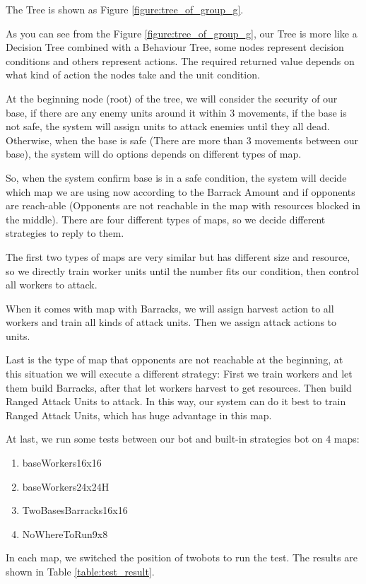 The Tree is shown as Figure \ref{figure:tree_of_group_g}.



As you can see from the Figure \ref{figure:tree_of_group_g}, our Tree is more like a Decision Tree combined with
a Behaviour Tree, some nodes represent decision conditions and others represent actions. The required
returned value depends on what kind of action the nodes take and the unit condition. 

At the beginning node (root) of the tree, we will consider the security of our base, if there are any enemy
units around it within 3 movements, if the base is not safe, the system will assign units to attack enemies
until they all dead. Otherwise, when the base is safe (There are more than 3 movements between our base),
the system will do options depends on different types of map. 

So, when the system confirm base is in a safe condition, the system will decide which map we are using now
according to the Barrack Amount and if opponents are reach-able (Opponents are not reachable in the map with
resources blocked in the middle). There are four different types of maps, so we decide different strategies
to reply to them. 

The first two types of maps are very similar but has different size and resource, so we directly train worker
units until the number fits our condition, then control all workers to attack.



When it comes with map with Barracks, we will assign harvest action to all workers and train all kinds of
attack units. Then we assign attack actions to units.



Last is the type of map that opponents are not reachable at the beginning, at this situation we will execute
a different strategy: First we train workers and let them build Barracks, after that let workers harvest to get
resources. Then build Ranged Attack Units to attack. In this way, our system can do it best to train Ranged Attack
Units, which has huge advantage in this map.



At last, we run some tests between our bot and built-in strategies bot on 4 maps:
\begin{enumerate}
    \item baseWorkers16x16
    \item baseWorkers24x24H
    \item TwoBasesBarracks16x16
    \item NoWhereToRun9x8
\end{enumerate}
In each map, we switched the position of twobots to run the test. The results are shown in Table \ref{table:test_result}.

